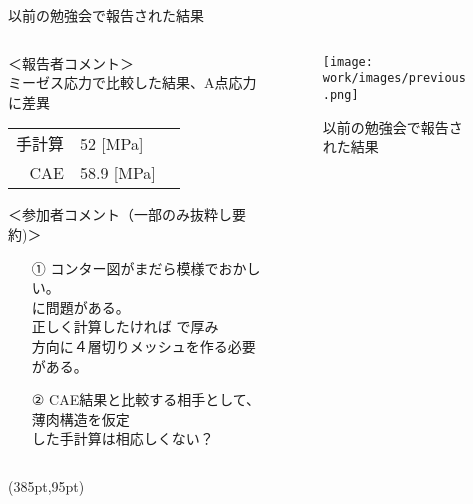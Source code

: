 \begin{frame}{以前の勉強会で報告された結果}
 
    \begin{columns}[t]
    \begin{column}{0.7\textwidth}
       ＜報告者コメント＞ \\
         ミーゼス応力で比較した結果、A点応力に差異 \\
          \begin{table}[hbtp]
            \begin{tabular}{rlp{10em}} %
               手計算 & 52 [\si{\mega\pascal}] & \\
               CAE    & 58.9 [\si{\mega\pascal}]  & \\
            \end{tabular}
          \end{table}
        ＜参加者コメント（一部のみ抜粋し要約)＞ \\
         \begin{itemize}
            \item[①] コンター図がまだら模様でおかしい。\\
                     に問題がある。 \\
                     正しく計算したければ で厚み\\
                     方向に４層切りメッシュを作る必要がある。\\
            \item[②] CAE結果と比較する相手として、薄肉構造を仮定 \\
                     した手計算は相応しくない？
         \end{itemize}
    \end{column}
    \begin{column}{0.3\textwidth}
      \begin{figure}[htbp]
        \begin{center}
          \texttt{[image: work/images/previous.png]}
            \caption{以前の勉強会で報告された結果} \label{fig:previous}
        \end{center}
      \end{figure}
    \end{column}
  \end{columns}
  \begin{textblock*}{30pt}(385pt,95pt)
  \end{textblock*}
\end{frame}
